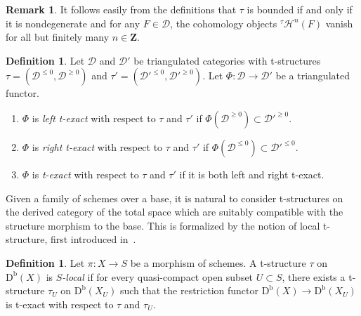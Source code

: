 \documentclass[11pt, reqno]{amsart}
\numberwithin{equation}{section}
\theoremstyle{plain}
\theoremstyle{remark}
\theoremstyle{definition}
\newtheorem{definition}[theorem]{Definition}
\newtheorem{remark}[theorem]{Remark}
\theoremstyle{italicsname}
\newcommand{\Db}{\mathrm{D^b}}
\newcommand{\cH}{\mathcal{H}}
\newcommand{\cD}{\mathscr{D}}
\newcommand{\bZ}{\mathbf{Z}}
\begin{document}
\begin{remark}
\label{remark-bounded-t-structures}
    It follows easily from the definitions that $\tau$ is bounded if and only if it is nondegenerate and for any $F \in \cD$, the cohomology objects ${^\tau}\cH^n(F)$ vanish for all but finitely many $n \in \bZ$. 
\end{remark}

\begin{definition}
    Let $\cD$ and $\cD'$ be triangulated categories with t-structures $\tau = (\cD^{\leqslant 0}, \cD^{\geqslant 0})$ and $\tau'  = (\cD'^{\leqslant 0}, \cD'^{\geqslant 0})$. 
    Let $\Phi \colon \cD \to \cD'$ be a triangulated functor. 
    \begin{enumerate}
        \item $\Phi$ is \emph{left t-exact} with respect to $\tau$ and $\tau'$ if $\Phi(\cD^{ \geqslant 0}) \subset \cD'^{\geqslant 0}$. 
        \item $\Phi$ is \emph{right t-exact} with respect to $\tau$ and $\tau'$ if $\Phi(\cD^{ \leqslant 0}) \subset \cD'^{\leqslant 0}$.  
        \item $\Phi$ is \emph{t-exact} with respect to $\tau$ and $\tau'$ if it is both left and right t-exact. 
    \end{enumerate}
\end{definition}

Given a family of schemes over a base, it is natural to consider t-structures on the derived category of the total space which are suitably compatible with the structure morphism to the base. 
This is formalized by the notion of local t-structure, first introduced in~\cite[Section 2.3]{P-t-structures}.

\begin{definition}\label{def:SlocalTstructure}
Let $\pi \colon X\to S$ be a morphism of schemes.
A t-structure $\tau$ on $\Db(X)$ is \emph{$S$-local} if for every quasi-compact open subset $U\subset S$, there exists a t-structure $\tau_U$ on $\Db(X_U)$ such that the restriction functor $\Db(X)\to\Db(X_U)$ is t-exact with respect to $\tau$ and $\tau_U$.  
\end{definition}
\end{document}
